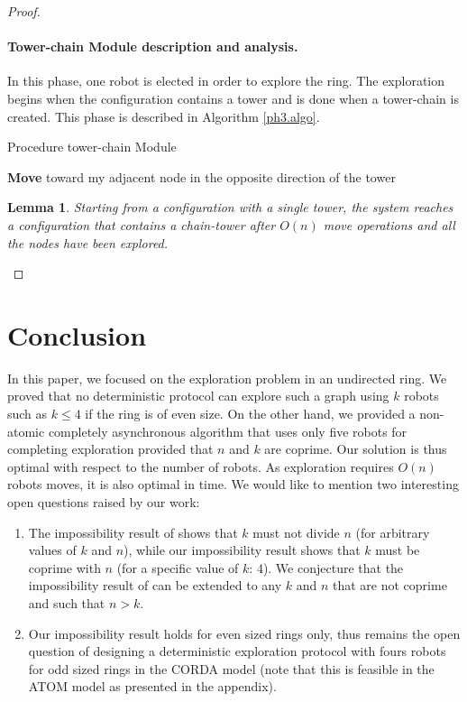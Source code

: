 \documentclass[12pt]{llncs}
\newtheorem{lem}{Lemma}
\begin{document}
\begin{proof}
\paragraph{Tower-chain Module description and analysis.}\label{sec:ph3}
In this phase, one robot is elected in order to explore the ring. The exploration begins when the configuration contains a tower and is done when a tower-chain is created. This phase is described in Algorithm \ref{ph3.algo}.
{\footnotesize
\begin{algorithm}[htbp]
  \caption{ Procedure tower-chain Module}
  \label{ph3.algo}
 \begin{algorithmic}[1]
        \State \textbf{Move} toward my adjacent node in the opposite direction of the tower 
       \EndIf 
      \EndIf
       \end{algorithmic}
\end{algorithm} 
}
\begin {lem}
\label{lem:ph3}
Starting from a configuration with a single tower, the system reaches a configuration that contains a chain-tower after $O(n)$ move operations and all the nodes have been explored.
\end {lem}



\end{proof}

\section{Conclusion}
In this paper, we focused on the exploration problem in an undirected ring. We proved that no deterministic protocol can explore such a graph using $k$ robots such as $k\leq 4$ if the ring is of even size. On the other hand, we provided a non-atomic completely asynchronous algorithm that uses only five robots for completing exploration provided that $n$ and $k$ are coprime. Our solution is thus optimal with respect to the number of robots. As exploration requires $O(n)$ robots moves, it is also optimal in time. We would like to mention two interesting open questions raised by our work:
\begin{enumerate}
\item The impossibility result of \cite{davi07} shows that $k$ must not divide $n$ (for arbitrary values of $k$ and $n$), while our impossibility result shows that $k$ must be coprime with $n$ (for a specific value of $k$: $4$). We conjecture that the impossibility result of \cite{davi07} can be extended to any $k$ and $n$ that are not coprime and such that $n>k$. 
\item Our impossibility result holds for even sized rings only, thus remains the open question of designing a deterministic exploration protocol with fours robots for odd sized rings in the CORDA model (note that this is feasible in the ATOM model as presented in the appendix).
\end{enumerate}
\end{document}
